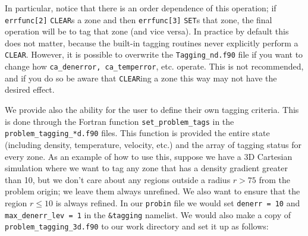 In particular, notice that there is an order dependence of this operation; if {\tt errfunc[2]} 
{\tt CLEAR}s a zone and then {\tt errfunc[3]} {\tt SET}s that zone, the final operation will 
be to tag that zone (and vice versa). In practice by default this does not matter, because the 
built-in tagging routines never explicitly perform a \texttt{CLEAR}. However, 
it is possible to overwrite the {\tt Tagging\_nd.f90} file if you want to change how 
{\tt ca\_denerror, ca\_temperror}, etc. operate. This is not recommended, and if you do so
be aware that {\tt CLEAR}ing a zone this way may not have the desired effect.

We provide also the ability for the user to define their own tagging criteria.
This is done through the Fortran function {\tt set\_problem\_tags} in the 
{\tt problem\_tagging\_*d.f90} files. This function is provided the entire 
state (including density, temperature, velocity, etc.) and the array 
of tagging status for every zone. As an example of how to use this, suppose we 
have a 3D Cartesian simulation where we want to tag any zone that has a 
density gradient greater than 10, but we don't care about any regions 
outside a radius $r > 75$ from the problem origin; we leave them always unrefined. 
We also want to ensure that the region $r \leq 10$ is always refined.
In our {\tt probin} file we would set {\tt denerr = 10} and {\tt max\_denerr\_lev = 1}
in the {\tt \&tagging} namelist. We would also make a copy of 
{\tt problem\_tagging\_3d.f90} to our work directory and set it up as follows:
\clearpage
